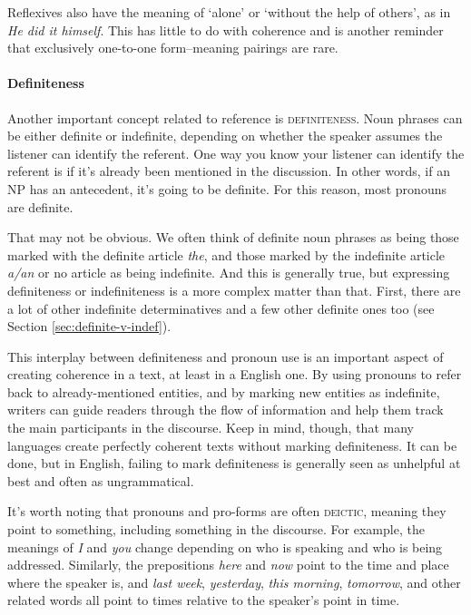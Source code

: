 Reflexives also have the meaning of `alone' or `without the help of others', as in \textit{He did it himself}. This has little to do with coherence and is another reminder that exclusively one-to-one form--meaning pairings are rare.

\paragraph*{Definiteness}
Another important concept related to reference is \textsc{definiteness}. Noun phrases can be either definite or indefinite, depending on whether the speaker assumes the listener can identify the referent. One way you know your listener can identify the referent is if it's already been mentioned in the discussion. In other words, if an NP has an antecedent, it's going to be definite. For this reason, most pronouns are definite.

That may not be obvious. We often think of definite noun phrases as being those marked with the definite article \textit{the}, and those marked by the indefinite article \textit{a/an} or no article as being indefinite. And this is generally true, but expressing definiteness or indefiniteness is a more complex matter than that. First, there are a lot of other indefinite determinatives and a few other definite ones too (see Section \ref{sec:definite-v-indef}).

This interplay between definiteness and pronoun use is an important aspect of creating coherence in a text, at least in a English one. By using pronouns to refer back to already-mentioned entities, and by marking new entities as indefinite, writers can guide readers through the flow of information and help them track the main participants in the discourse. Keep in mind, though, that many languages create perfectly coherent texts without marking definiteness. It can be done, but in English, failing to mark definiteness is generally seen as unhelpful at best and often as ungrammatical.

It's worth noting that pronouns and pro-forms are often \textsc{deictic}, meaning they point to something, including something in the discourse. For example, the meanings of \textit{I} and \textit{you} change depending on who is speaking and who is being addressed. Similarly, the prepositions \textit{here} and \textit{now} point to the time and place where the speaker is, and \textit{last week}, \textit{yesterday}, \textit{this morning}, \textit{tomorrow}, and other related words all point to times relative to the speaker's point in time.

